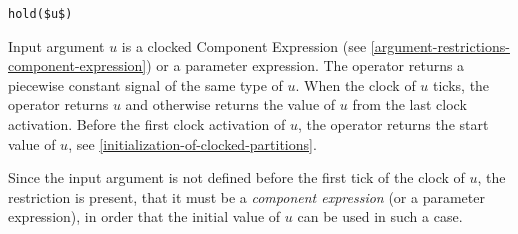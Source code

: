 \begin{operatordefinition}[hold]
\begin{synopsis}\begin{lstlisting}
hold($u$)
\end{lstlisting}\end{synopsis}
\begin{semantics}
Input argument $u$ is a clocked Component Expression (see \cref{argument-restrictions-component-expression}) or a parameter expression.  The operator returns a piecewise constant signal of the same type of $u$.  When the clock of $u$ ticks, the operator returns $u$ and otherwise returns the value of $u$ from the last clock activation.  Before the first clock activation of $u$, the operator returns the start value of $u$, see \cref{initialization-of-clocked-partitions}.
\begin{nonnormative}
Since the input argument is not defined before the first tick of the clock of $u$, the restriction is present, that it must be a \emph{component expression} (or a parameter expression), in order that the initial value of $u$ can be used in such a case.
\end{nonnormative}
\end{semantics}
\end{operatordefinition}

